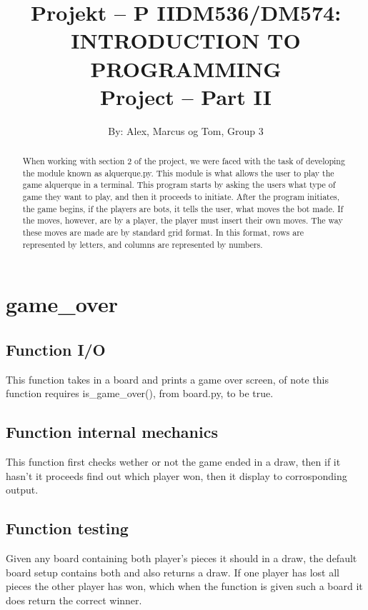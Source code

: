 \documentclass[12pt]{article}
\title{Projekt – P II}
\title{DM536/DM574: INTRODUCTION TO PROGRAMMING \\ Project – Part II}
\author{By: Alex, Marcus og Tom, Group 3}
\begin{document}
\maketitle

\begin{abstract}
When working with section 2 of the project, we were faced with the task of developing the module known as alquerque.py. This module is what allows the user to play the game alquerque in a terminal. This program starts by asking the users what type of game they want to play, and then it proceeds to initiate. After the program initiates, the game begins, if the players are bots, it tells the user, what moves the bot made. If the moves, however, are by a player, the player must insert their own moves. The way these moves are made are by standard grid format. In this format, rows are represented by letters, and columns are represented by numbers.
\end{abstract}

\section{game\_over}
\subsection{Function I/O}
This function takes in a board and prints a game over screen, of note this function requires is_game_over(), from board.py, to be true.

\subsection{Function internal mechanics}
This function first checks wether or not the game ended in a draw, then if it hasn't it proceeds find out which player won, then it display to corrosponding output.

\subsection{Function testing}
Given any board containing both player's pieces it should in a draw, the default board setup contains both and also returns a draw.
If one player has lost all pieces the other player has won, which when the function is given such a board it does return the correct winner.
\end{document}
